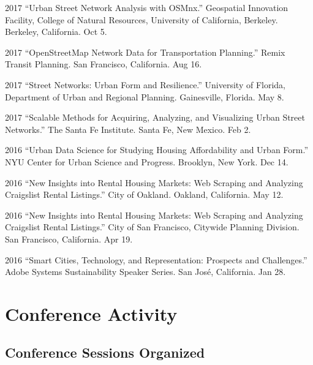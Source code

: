 \documentclass{academiccv}
\begin{document}
\begin{tablist}
\item[2017] \tab \enquote{Urban Street Network Analysis with OSMnx.} Geospatial Innovation Facility, College of Natural Resources, University of California, Berkeley. Berkeley, California. Oct 5.

\item[2017] \tab \enquote{OpenStreetMap Network Data for Transportation Planning.} Remix Transit Planning. San Francisco, California. Aug 16.

\item[2017] \tab \enquote{Street Networks: Urban Form and Resilience.} University of Florida, Department of Urban and Regional Planning. Gainesville, Florida. May 8.

\item[2017] \tab \enquote{Scalable Methods for Acquiring, Analyzing, and Visualizing Urban Street Networks.} The Santa Fe Institute. Santa Fe, New Mexico. Feb 2.

\item[2016] \tab \enquote{Urban Data Science for Studying Housing Affordability and Urban Form.} NYU Center for Urban Science and Progress. Brooklyn, New York. Dec 14.

\item[2016] \tab \enquote{New Insights into Rental Housing Markets: Web Scraping and Analyzing Craigslist Rental Listings.} City of Oakland. Oakland, California. May 12.

\item[2016] \tab \enquote{New Insights into Rental Housing Markets: Web Scraping and Analyzing Craigslist Rental Listings.} City of San Francisco, Citywide Planning Division. San Francisco, California. Apr 19.

\item[2016] \tab \enquote{Smart Cities, Technology, and Representation: Prospects and Challenges.} Adobe Systems Sustainability Speaker Series. San José, California. Jan 28.

\end{tablist}



\section*{Conference Activity}

\subsection*{Conference Sessions Organized}
\end{document}
